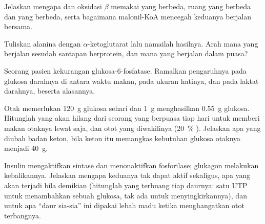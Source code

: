 \begin{exercise}[$\star\star$]\label{exo:b1:biosyntheses-integration:7}
Jelaskan mengapa  dan oksidasi $\beta$ memakai 
yang berbeda, ruang yang berbeda dan  yang berbeda, serta
bagaimana malonil-KoA mencegah keduanya berjalan bersama.
\end{exercise}

\begin{exercise}[$\star\star$]\label{exo:b1:biosyntheses-integration:8}
Tuliskan  alanina dengan $\alpha$-ketoglutarat lalu
namailah hasilnya. Arah mana yang berjalan sesudah santapan berprotein,
dan mana yang berjalan dalam puasa?
\end{exercise}

\begin{exercise}[$\star\star$]\label{exo:b1:biosyntheses-integration:9}
Seorang pasien kekurangan glukosa-6-fosfatase. Ramalkan pengaruhnya
pada glukosa darahnya di antara waktu makan, pada ukuran hatinya, dan
pada laktat darahnya, beserta alasannya.
\end{exercise}

\begin{exercise}[$\star\star\star$]\label{exo:b1:biosyntheses-integration:10}
Otak memerlukan \qty{120}{g} glukosa sehari dan \qty{1}{g} 
menghasilkan \qty{0.55}{g} glukosa. Hitunglah  yang akan hilang
dari seorang yang berpuasa tiap hari untuk memberi makan otaknya lewat
 saja, dan otot yang diwakilinya (\qty{20}{\%} ).
Jelaskan apa yang diubah badan keton, bila keton itu memangkas
kebutuhan glukosa otaknya menjadi \qty{40}{g}.
\end{exercise}

\begin{exercise}[$\star\star\star$]\label{exo:b1:biosyntheses-integration:11}
Insulin mengaktifkan  sintase dan menonaktifkan 
fosforilase; glukagon melakukan kebalikannya. Jelaskan mengapa keduanya
tak dapat aktif sekaligus, apa yang akan terjadi bila demikian
(hitunglah  yang terbuang tiap daurnya: satu UTP untuk menambahkan
sebuah glukosa, tak ada untuk menyingkirkannya), dan untuk apa ``daur
sia-sia'' ini dipakai lebah madu ketika menghangatkan otot terbangnya.
\end{exercise}

